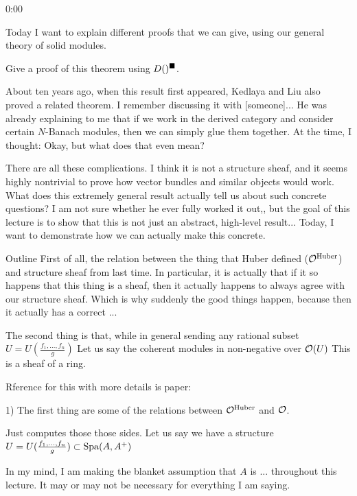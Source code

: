 \begin{unfinished}{0:00}
{\begin{theorem}
Today I want to explain different proofs that we can give, using our general theory of solid modules. 
\begin{goal}
Give a proof of this theorem using $D( )^\blacksquare$.
\end{goal}
About ten years ago, when this result first appeared, Kedlaya and Liu also proved a related theorem. I remember discussing it with [someone]...
He was already explaining to me that if we work in the derived category and consider certain 
$N$-Banach modules, then we can simply glue them together.
At the time, I thought: Okay, but what does that even mean?

There are all these complications. I think it is not a structure sheaf, and it seems highly nontrivial to prove how vector bundles and similar objects would work. 
What does this extremely general result actually tell us about such concrete questions?  
I am not sure whether he ever fully worked it out,, but the goal of this lecture is to show that this is not just an abstract, high-level result...
Today, I want to demonstrate how we can actually make this concrete.

Outline
First of all, the relation between the thing that Huber defined ($\mathcal O^{\mathrm{Huber}}$) and structure sheaf from last time.
In particular, it is actually that if it so happens that this thing is a sheaf, then it actually happens to always agree with our structure sheaf. Which is why suddenly the good things happen, because then it actually has a correct ... 

The second thing is that, while in general sending any rational subset $U = U(\frac{f_1,\ldots,f_n}{g}) $
Let us say the coherent modules in non-negative 
over $\mathcal O(U)$
This is a sheaf of a ring.

Rference for this with more details is paper: 

1) The first thing are some of the relations between $\mathcal O^{\mathrm{Huber}}$ and $\mathcal O$.

\begin{proposition}
Just computes those those sides.
Let us say we have a structure $U = U(\frac{f_1,\ldots,f_n}{g}) \subset \operatorname{Spa}(A,A^+)$
\end{proposition}

In my mind, I am making the blanket assumption that $A$ is ... throughout this lecture. It may or may not be necessary for everything I am saying. 


\end{theorem}}
\end{unfinished}
